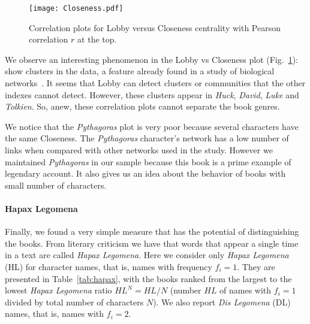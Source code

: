 \documentclass[review]{elsarticle}
\begin{document}
\begin{figure}[ht]
\centering
\texttt{[image: Closeness.pdf]}
\caption{\label{FigC} Correlation plots for  
Lobby versus Closeness centrality 
with Pearson correlation $r$ at the top.}
\end{figure}

We observe an interesting phenomenon in 
the Lobby vs Closeness plot (Fig.~\ref{FigC}):
show clusters in the data, a feature already found in a study
of biological networks~\cite{campiteli2013}. 
It seems that Lobby can detect clusters or communities that
the other indexes cannot detect. However,
these clusters appear in \emph{Huck}, \emph{David},
\emph{Luke} and \emph{Tolkien}. So, anew, these correlation plots 
cannot separate the book genres.

We notice that the \emph{Pythagoras} 
plot is very poor because several
characters have the same Closeness. 
The \emph{Pythagoras} character's 
network has a low number of links when compared 
with other networks used in the study. However we maintained 
\emph{Pythagoras} in our sample because this 
book is a prime example of legendary account. It also gives
us an idea about the behavior of books with small number
of characters.


\paragraph{Hapax Legomena}
Finally, we found a very simple measure that has the potential
of distinguishing the books. 
From literary criticism we have that words that 
appear a single time in a text are called 
\emph{Hapax Legomena}.
Here we consider only \emph{Hapax Legomena} (HL) for character names,
that is, names with frequency $f_i=1$. They are presented 
in Table~\ref{tab:hapax},
with the books ranked from the largest to the lowest
\emph{Hapax Legomena} ratio $HL^N= HL/N$ (number $HL$ of names with 
$f_i = 1$ divided by  total number of characters $N$).
We also report \emph{Dis Legomena} (DL) names,
that is, names with $f_i=2$. 
\end{document}

